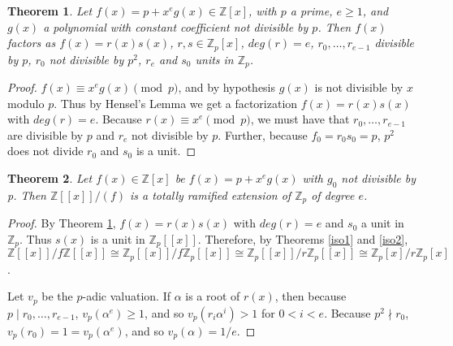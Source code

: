 \documentclass{article}
\newtheorem{theorem}{Theorem}
\begin{document}
\begin{theorem} \label{factor}
Let $f(x) = p + x^e g(x) \in \mathbb{Z}[x]$, with $p$ a prime, $e \ge 1$, and $g(x)$ a polynomial with constant coefficient not divisible by $p$.  Then $f(x)$ factors as $f(x) = r(x)s(x)$, $r,s \in \mathbb{Z}_p[x]$, $deg(r) = e$, $r_0, \ldots, r_{e-1}$ divisible by $p$, $r_0$ not divisible by $p^2$, $r_e$ and $s_0$ units in $\mathbb{Z}_p$.
\end{theorem}

\begin{proof}
$f(x) \equiv x^e g(x) \pmod{p}$, and by hypothesis $g(x)$ is not divisible by $x$ modulo $p$.  Thus by Hensel's Lemma we get a factorization $f(x) = r(x)s(x)$ with $deg(r) = e$.  Because $r(x) \equiv x^e \pmod{p}$, we must have that $r_0, \ldots, r_{e-1}$ are divisible by $p$ and $r_e$ not divisible by $p$.  Further, because $f_0 = r_0 s_0 = p$, $p^2$ does not divide $r_0$ and $s_0$ is a unit.
\end{proof}


\begin{theorem}
Let $f(x) \in \mathbb{Z}[x]$ be $f(x) = p + x^e g(x)$ with $g_0$ not divisible by p.  Then $\mathbb{Z}[[x]]/(f)$ is a totally ramified extension of $\mathbb{Z}_p$ of degree $e$.
\end{theorem}

\begin{proof}
By Theorem \ref{factor}, $f(x) = r(x)s(x)$ with $deg(r) = e$ and $s_0$ a unit in $\mathbb{Z}_p$.  Thus $s(x)$ is a unit in $\mathbb{Z}_p[[x]]$.  Therefore, by Theorems \ref{iso1} and \ref{iso2}, $\mathbb{Z}[[x]]/f\mathbb{Z}[[x]] \cong \mathbb{Z}_p[[x]]/f\mathbb{Z}_p[[x]] \cong \mathbb{Z}_p[[x]]/r\mathbb{Z}_p[[x]] \cong \mathbb{Z}_p[x]/r\mathbb{Z}_p[x]$.

Let $v_p$ be the $p$-adic valuation.  If $\alpha$ is a root of $r(x)$, then because $p \mid r_0, \ldots, r_{e-1}$, $v_p(\alpha^e) \ge 1$, and so $v_p(r_i \alpha^i) > 1$ for $0 < i < e$. Because $p^2 \nmid r_0$, $v_p(r_0) = 1 = v_p(\alpha^e)$, and so $v_p(\alpha) = 1/e$.

\end{proof}



\end{document}
